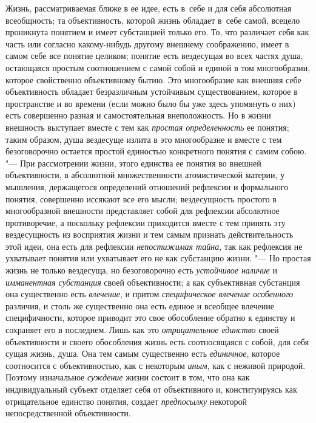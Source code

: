 Жизнь, рассматриваемая ближе в ее идее, есть в~себе и для себя
абсолютная всеобщность; та объективность, которой жизнь обладает в~себе
самой, всецело проникнута понятием и имеет субстанцией только его. То, что
различает себя как часть или согласно какому-нибудь другому внешнему
соображению, имеет в самом себе все понятие целиком; понятие есть
вездесущая во всех частях душа, остающаяся простым соотношением с самой
собой и единой в том многообразии, которое свойственно объективному бытию.
Это многообразие как внешняя себе объективность обладает безразличным
устойчивым существованием, которое в пространстве и во времени (если можно
было бы уже здесь упомянуть о них) есть совершенно разная и самостоятельная
внеположность. Но в жизни внешность выступает вместе с тем как
{\em простая определенность}
ее понятия; таким образом, душа вездесуще излита в это
многообразие и вместе с тем безоговорочно остается простой единостью
конкретного понятия с самим собою. "--- При рассмотрении жизни,
этого единства ее понятия во внешней объективности, в абсолютной
множественности атомистической материи, у мышления,
держащегося определений отношений рефлексии и формального понятия,
совершенно иссякают все его мысли; вездесущность простого в многообразной
внешности представляет собой для рефлексии абсолютное противоречие, а
поскольку рефлексии приходится вместе с тем принять эту вездесущность из
восприятия жизни и тем самым признать действительность этой идеи, она есть
для рефлексии {\em непостижимая тайна},
так как рефлексия не ухватывает понятия или ухватывает его не
как субстанцию жизни. "--- Но простая жизнь не только
вездесуща, но безоговорочно есть
{\em устойчивое наличие}
и {\em имманентная
субстанция} своей объективности; а как субъективная
субстанция она существенно есть
{\em влечение}, и притом
{\em специфическое влечение особенного}
различия, и столь же существенно она есть единое и всеобщее
влечение специфичности, которое приводит это свое обособление обратно к
единству и сохраняет его в последнем. Лишь как это
{\em отрицательное единство}
своей объективности и своего обособления жизнь есть
соотносящаяся с собой, для себя сущая жизнь, душа. Она тем самым
существенно есть {\em единичное},
которое соотносится с объективностью, как с некоторым {\em иным},
как с неживой природой. Поэтому изначальное
{\em суждение}
жизни состоит в том, что она как индивидуальный субъект
отделяет себя от объективного и, конституируясь как отрицательное единство
понятия, создает {\em предпосылку} некоторой непосредственной объективности.

